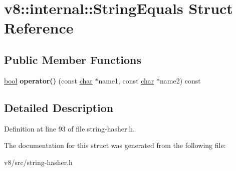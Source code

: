 \hypertarget{structv8_1_1internal_1_1StringEquals}{}\section{v8\+:\+:internal\+:\+:String\+Equals Struct Reference}
\label{structv8_1_1internal_1_1StringEquals}
\subsection*{Public Member Functions}
\begin{DoxyCompactItemize}
\item 
\mbox{\label{structv8_1_1internal_1_1StringEquals_aed824c2384993fea4c169cbd1bd32833}} 
\mbox{\hyperlink{classbool}{bool}} {\bfseries operator()} (const \mbox{\hyperlink{classchar}{char}} $\ast$name1, const \mbox{\hyperlink{classchar}{char}} $\ast$name2) const
\end{DoxyCompactItemize}


\subsection{Detailed Description}


Definition at line 93 of file string-\/hasher.\+h.



The documentation for this struct was generated from the following file\+:\begin{DoxyCompactItemize}
\item 
v8/src/string-\/hasher.\+h\end{DoxyCompactItemize}
